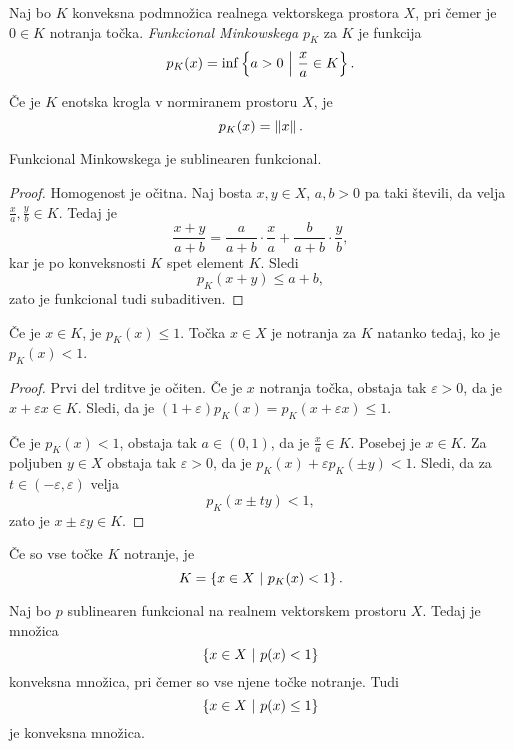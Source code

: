 \begin{definicija}
Naj bo $K$ konveksna podmnožica realnega vektorskega prostora $X$,
pri čemer je $0 \in K$ notranja točka.
\emph{Funkcional Minkowskega} $p_K$
za $K$ je funkcija
\[
p_K(x) = \inf \left\{a > 0~\middle\vert~\frac{x}{a} \in K\right\}.
\]
\end{definicija}

\begin{zgled}
Če je $K$ enotska krogla v normiranem prostoru $X$, je
\[
p_K(x) = \left\lVert x\right\rVert.
\]
\end{zgled}

\begin{trditev}
Funkcional Minkowskega je sublinearen funkcional.
\end{trditev}

\begin{proof}
Homogenost je očitna. Naj bosta $x, y \in X$, $a, b > 0$ pa taki
števili, da velja $\frac{x}{a}, \frac{y}{b} \in K$. Tedaj je
\[
\frac{x+y}{a+b} =
\frac{a}{a+b} \cdot \frac{x}{a} + \frac{b}{a+b} \cdot \frac{y}{b},
\]
kar je po konveksnosti $K$ spet element $K$. Sledi
\[
p_K(x+y) \leq a + b,
\]
zato je funkcional tudi subaditiven.
\end{proof}

\begin{trditev}
Če je $x \in K$, je $p_K(x) \leq 1$. Točka $x \in X$ je notranja za
$K$ natanko tedaj, ko je $p_K(x) < 1$.
\end{trditev}

\begin{proof}
Prvi del trditve je očiten. Če je $x$ notranja točka, obstaja tak
$\varepsilon > 0$, da je $x + \varepsilon x \in K$. Sledi, da je
$(1+\varepsilon) p_K(x) = p_K(x + \varepsilon x) \leq 1$.

Če je $p_K(x) < 1$, obstaja tak $a \in (0, 1)$, da je
$\frac{x}{a} \in K$. Posebej je $x \in K$. Za poljuben $y \in X$
obstaja tak $\varepsilon > 0$, da je
$p_K(x) + \varepsilon p_K(\pm y) < 1$. Sledi, da za
$t \in (-\varepsilon, \varepsilon)$ velja
\[
p_K(x \pm t y) < 1,
\]
zato je $x \pm \varepsilon y \in K$.
\end{proof}

\begin{opomba}
Če so vse točke $K$ notranje, je
\[
K = \left\{x \in X~\middle\vert~p_K(x) < 1\right\}.
\]
\end{opomba}

\begin{posledica}
Naj bo $p$ sublinearen funkcional na realnem vektorskem prostoru
$X$. Tedaj je množica
\[
\left\{x \in X~\middle\vert~p(x) < 1\right\}
\]
konveksna množica, pri čemer so vse njene točke notranje. Tudi
\[
\left\{x \in X~\middle\vert~p(x) \leq 1\right\}
\]
je konveksna množica.
\end{posledica}

